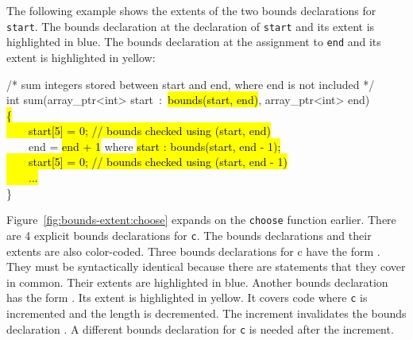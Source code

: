 The following example shows the extents of the two bounds declarations for
\texttt{start}.  The bounds declaration at the declaration of \texttt{start} and 
its extent is highlighted in blue. The bounds declaration at the assignment 
to \texttt{end} and its extent is highlighted in yellow:

\begin{tt}
/* sum integers stored between start and end, where end is not included */ \\  
int sum(array\_ptr<int> start~:~\hl{bounds(start, end)}, array\_ptr<int> end)\\
\hl{\{\\
~~~~start[5] = 0; // bounds checked using (start, end)}\\
\mbox{~~~~end} = \hl{end + 1} where \hl{start : bounds(start, end - 1);\\
~~~~start[5] = 0; // bounds checked using (start, end - 1)\\
\mbox{~~~~}...\\
}\}
\end{tt}

Figure~\ref{fig:bounds-extent:choose} expands on the \texttt{choose} function earlier. 
There are 4 explicit bounds declarations for \texttt{c}. The bounds declarations
and their extents are also color-coded. Three bounds declarations for c
have the form . They must be syntactically
identical because there are statements that they cover in common. Their
extents are highlighted in blue.  Another bounds declaration has
the form .   Its extent is highlighted
in yellow. It covers code where \texttt{c} is incremented and the 
length is decremented.  The increment invalidates the bounds declaration
.  A different bounds declaration for \texttt{c}
is needed after the increment.

